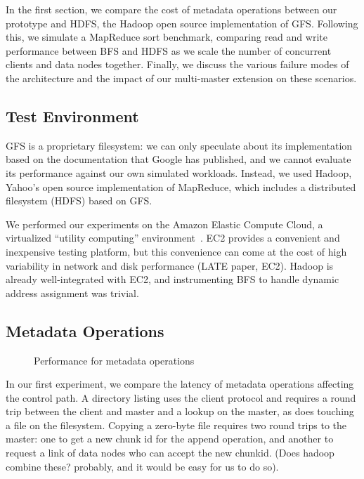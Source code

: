 \documentclass{article}
\begin{document}
In the first section, we compare the cost of metadata operations
between our prototype and HDFS, the Hadoop open source implementation
of GFS.  Following this, we simulate a MapReduce sort benchmark,
comparing read and write performance between BFS and HDFS as we scale
the number of concurrent clients and data nodes together.  Finally, we
discuss the various failure modes of the architecture and the impact
of our multi-master extension on these scenarios.

\subsection{Test Environment}
GFS is a proprietary filesystem: we can only speculate about its
implementation based on the documentation that Google has published,
and we cannot evaluate its performance against our own simulated
workloads.  Instead, we used Hadoop, Yahoo's open source
implementation of MapReduce, which includes a distributed filesystem
(HDFS) based on GFS.

We performed our experiments on the Amazon Elastic Compute Cloud, a
virtualized ``utility computing'' environment~\cite{amazon-ec2}.  EC2
provides a convenient and inexpensive testing platform, but this
convenience can come at the cost of high variability in network and
disk performance (LATE paper, EC2).  Hadoop is already well-integrated
with EC2, and instrumenting BFS to handle dynamic address assignment
was trivial.

\subsection{Metadata Operations}
\begin{figure}
\centering
{}
\caption{Performance for metadata operations}
\label{fig:metadata-perf}
\end{figure}

In our first experiment, we compare the latency of metadata operations
affecting the control path.  A directory listing uses the client
protocol and requires a round trip between the client and master and a
lookup on the master, as does touching a file on the filesystem.
Copying a zero-byte file requires two round trips to the master: one
to get a new chunk id for the append operation, and another to request
a link of data nodes who can accept the new chunkid.  (Does hadoop
combine these?  probably, and it would be easy for us to do so).
\end{document}
